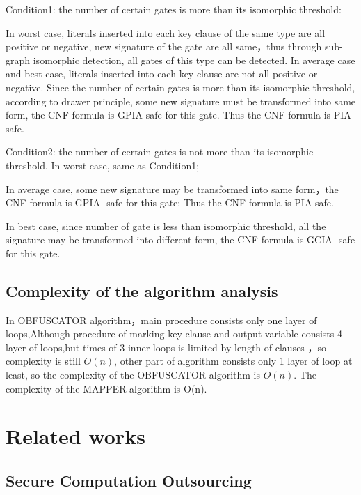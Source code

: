 \documentclass[runningheads,a4paper]{llncs}
\begin{document}
\noindent Condition1: the number of certain gates is more than its isomorphic threshold:

In worst case, literals inserted into each key clause of the same type are all positive or negative, new signature of the gate are all same，thus through sub-graph isomorphic detection, all gates of this type can be detected.
In average case and best case, literals inserted into each key clause are not all positive or negative. Since the number of certain gates is more than its isomorphic threshold, according to drawer principle, some new signature must be transformed into same form, the CNF formula is GPIA-safe for this gate. Thus the CNF formula is PIA-safe. 


\noindent Condition2: the number of certain gates is not more than its isomorphic threshold.
In worst case, same as Condition1; 

In average case, some new signature may be transformed into same form，the CNF formula is GPIA- safe for this gate; Thus the CNF formula is PIA-safe.

In best case, since number of gate is less than isomorphic threshold, all the signature may be transformed into different form, the CNF formula is GCIA- safe for this gate.

\subsection{Complexity of the algorithm analysis} 

 In OBFUSCATOR algorithm，main procedure consists only one layer of loops,Although procedure of marking key clause and output variable consists 4 layer of loops,but times of 3 inner loops is limited by length of clauses ，so complexity is still $O(n)$, other part of algorithm consists only 1 layer of loop at least, so the complexity of the OBFUSCATOR algorithm is $O (n)$. The complexity of the  MAPPER algorithm is  O(n).
\section{Related works} 
\subsection{Secure Computation Outsourcing}
\end{document}
